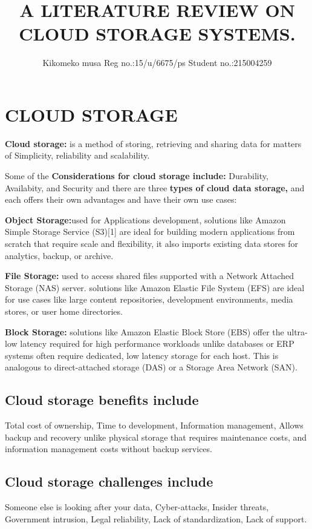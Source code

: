\documentclass[12pt]{article}
\begin{document}
	\title{A LITERATURE REVIEW ON CLOUD STORAGE SYSTEMS.}
	\author{Kikomeko musa Reg no.:15/u/6675/ps Student no.:215004259}
	\maketitle
	
	\section{CLOUD STORAGE}
	\textbf{Cloud storage:} is a method of storing, retrieving and sharing data for matters of Simplicity, reliability and scalability.
	
	 Some of the \textbf{Considerations for cloud storage include:} Durability, Availabity, and Security and there are three \textbf{types of cloud data storage,} and each offers their own advantages and have their own use cases:
	
	
	\textbf{Object Storage:}used for Applications development, solutions like Amazon Simple Storage Service (S3)[1] are ideal for building modern applications from scratch that require scale and flexibility, it also imports existing data stores for analytics, backup, or archive.
	
	
	\textbf{File Storage:} used to access shared files supported with a Network Attached Storage (NAS) server. solutions like Amazon Elastic File System (EFS) are ideal for use cases like large content repositories, development environments, media stores, or user home directories.
	
	
	\textbf{Block Storage:} solutions like Amazon Elastic Block Store (EBS) offer the ultra-low latency required for high performance workloads unlike databases or ERP systems often require dedicated, low latency storage for each host. This is analogous to direct-attached storage (DAS) or a Storage Area Network (SAN).
	
	
	\subsection*{Cloud storage benefits include} Total cost of ownership, Time to development, Information management, Allows backup and recovery unlike physical storage that requires maintenance costs, and information management costs without backup services.
	\subsection*{Cloud storage challenges include} Someone else is looking after your data, Cyber-attacks, Insider threats, Government intrusion, Legal reliability, Lack of standardization, Lack of support.
	
\end{document}
